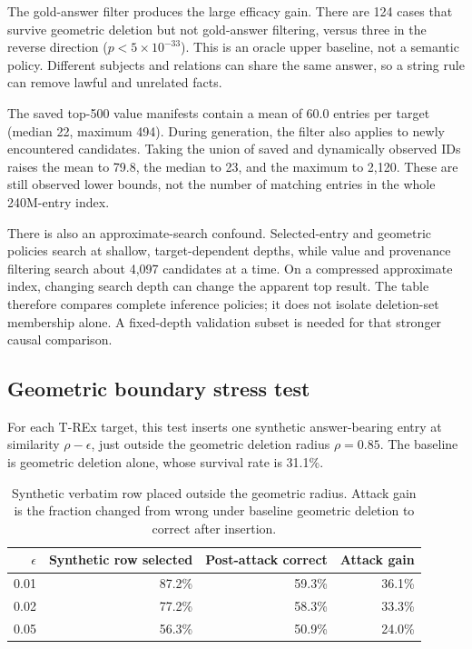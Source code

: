 \documentclass[11pt]{article}
\newcommand{\pct}[1]{#1\%}
\begin{document}
The gold-answer filter produces the large efficacy gain. There are 124 cases
that survive geometric deletion but not gold-answer filtering, versus three
in the reverse direction (\(p<5\times10^{-33}\)). This is an oracle upper
baseline, not a semantic policy. Different subjects and relations can share
the same answer, so a string rule can remove lawful and unrelated facts.

The saved top-500 value manifests contain a mean of 60.0 entries per target
(median 22, maximum 494). During generation, the filter also applies to newly
encountered candidates. Taking the union of saved and dynamically observed
IDs raises the mean to 79.8, the median to 23, and the maximum to 2,120.
These are still observed lower bounds, not the number of matching entries in
the whole 240M-entry index.

There is also an approximate-search confound. Selected-entry and geometric
policies search at shallow, target-dependent depths, while value and
provenance filtering search about 4,097 candidates at a time. On a compressed
approximate index, changing search depth can change the apparent top result.
The table therefore compares complete inference policies; it does not isolate
deletion-set membership alone. A fixed-depth validation subset is needed for
that stronger causal comparison.

\subsection{Geometric boundary stress test}

For each T-REx target, this test inserts one synthetic answer-bearing entry at
similarity \(\rho-\epsilon\), just outside the geometric deletion radius
\(\rho=0.85\). The baseline is geometric deletion alone, whose survival rate
is \pct{31.1}.

\begin{table}[H]
\centering
\caption{Synthetic verbatim row placed outside the geometric radius. Attack
gain is the fraction changed from wrong under baseline geometric deletion to
correct after insertion.}
\label{tab:adversarial}
\begin{tabular}{rrrr}
\toprule
\(\epsilon\) & Synthetic row selected & Post-attack correct & Attack gain \\
\midrule
0.01 & \pct{87.2} & \pct{59.3} & \pct{36.1} \\
0.02 & \pct{77.2} & \pct{58.3} & \pct{33.3} \\
0.05 & \pct{56.3} & \pct{50.9} & \pct{24.0} \\
\bottomrule
\end{tabular}
\end{table}
\end{document}
